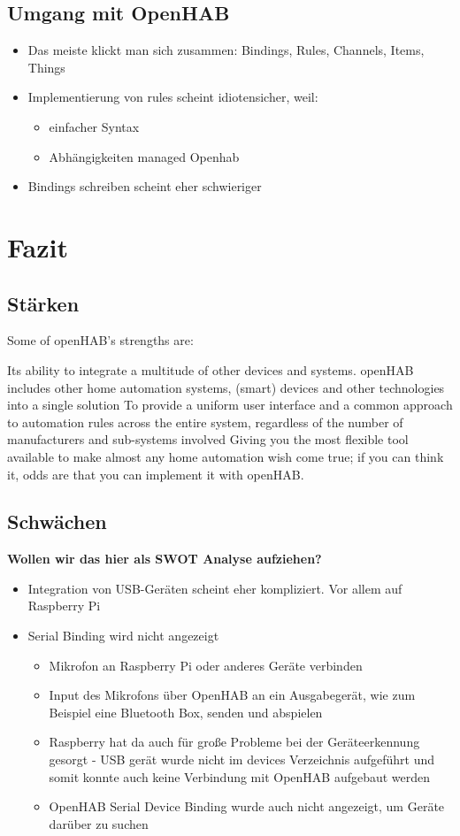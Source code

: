 \subsection{Umgang mit OpenHAB}
\begin{itemize}
	\item Das meiste klickt man sich zusammen: Bindings, Rules, Channels, Items, Things
	\item Implementierung von rules scheint idiotensicher, weil:
	\begin{itemize}
		\item einfacher Syntax
		\item Abhängigkeiten managed Openhab
	\end{itemize}
	\item Bindings schreiben scheint eher schwieriger
\end{itemize}

\section{Fazit}
\subsection{Stärken}
Some of openHAB's strengths are:

Its ability to integrate a multitude of other devices and systems. openHAB includes other home automation systems, (smart) devices and other technologies into a single solution
To provide a uniform user interface and a common approach to automation rules across the entire system, regardless of the number of manufacturers and sub-systems involved
Giving you the most flexible tool available to make almost any home automation wish come true; if you can think it, odds are that you can implement it with openHAB.
\subsection{Schwächen}
\textbf{Wollen wir das hier als SWOT Analyse aufziehen?}
\begin{itemize}
	\item Integration von USB-Geräten scheint eher kompliziert. Vor allem auf Raspberry Pi
	\item Serial Binding wird nicht angezeigt
	\begin{itemize}
		\item Mikrofon an Raspberry Pi oder anderes Geräte verbinden
		\item Input des Mikrofons über OpenHAB an ein Ausgabegerät, wie zum Beispiel eine Bluetooth Box, senden und abspielen
		\item Raspberry hat da auch für große Probleme bei der Geräteerkennung gesorgt - USB gerät wurde nicht im devices Verzeichnis aufgeführt und somit konnte auch keine Verbindung mit OpenHAB aufgebaut werden
		\item OpenHAB Serial Device Binding wurde auch nicht angezeigt, um Geräte darüber zu suchen
	\end{itemize}
\end{itemize}
